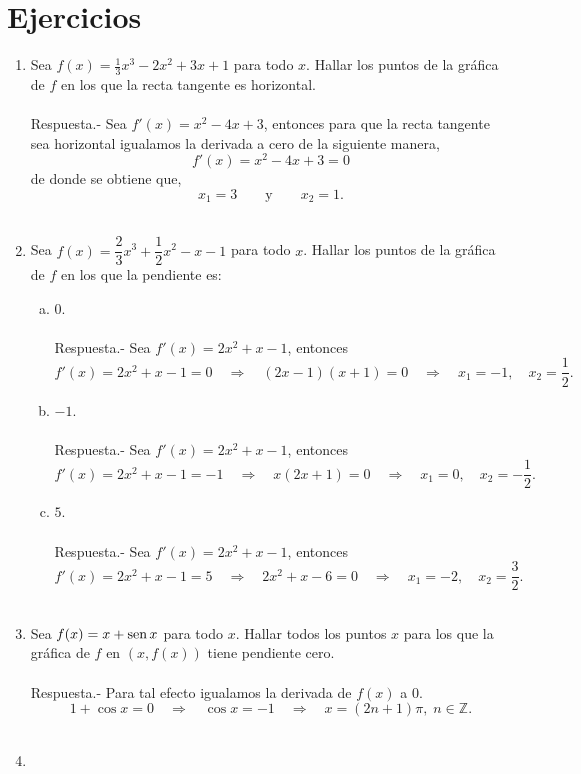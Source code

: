 \section{Ejercicios}
\begin{enumerate}[\bfseries 1.]

    \item Sea $f(x)=\frac{1}{3}x^3-2x^2+3x+1$ para todo $x$. Hallar los puntos de la gráfica de $f$ en los que la recta tangente es horizontal.\\\\
	Respuesta.-\; Sea  $f'(x)=x^2-4x+3$, entonces para que la recta tangente sea horizontal igualamos la derivada a cero de la siguiente manera,
	$$f'(x)=x^2-4x+3=0$$
	de donde se obtiene que,
	$$x_1=3\qquad \mbox{y}\qquad x_2=1.$$\\

    \item Sea $f(x)=\dfrac{2}{3}x^3+\dfrac{1}{2}x^2-x-1$ para todo $x$. Hallar los puntos de la gráfica de $f$ en los que la pendiente es:\\
	\begin{enumerate}[a)]
	    \item $0$.\\\\
		Respuesta.-\; Sea $f'(x)=2x^2+x-1$, entonces
		$$f'(x)=2x^2+x-1=0\quad \Rightarrow \quad (2x-1)(x+1)=0 \quad \Rightarrow\quad x_1=-1,\quad x_2=\dfrac{1}{2}.$$

	    \item $-1$.\\\\
		Respuesta.-\; Sea $f'(x)=2x^2+x-1$, entonces
		$$f'(x)=2x^2+x-1=-1\quad \Rightarrow \quad x(2x+1) = 0 \quad \Rightarrow \quad x_1=0,\quad x_2=-\dfrac{1}{2}.$$

	    \item $5$.\\\\
		Respuesta.-\; Sea $f'(x)=2x^2+x-1$, entonces
		$$f'(x)=2x^2+x-1=5\quad \Rightarrow \quad 2x^2+x-6=0 \quad \Rightarrow \quad x_1=-2,\quad x_2=\dfrac{3}{2}.$$\\

	\end{enumerate}

    \item Sea $f(x)=x+\mathop{\mbox{\normalfont sen}}\nolimits x$ para todo $x$. Hallar todos los puntos $x$ para los que la gráfica de $f$ en $\left(x,f(x)\right)$ tiene pendiente cero.\\\\
	Respuesta.- Para tal efecto igualamos la derivada de $f(x)$ a $0$.
	$$1+\cos x = 0 \quad \Rightarrow \quad \cos x = -1 \quad \Rightarrow \quad x=(2n+1)\pi,\; n\in \mathbb{Z}.$$\\

    \item 

\end{enumerate}
